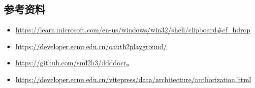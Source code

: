 \documentclass[14pt,a4paper,UTF8,twoside]{article}
\begin{document}
    \subsection{参考资料}

    \begin{itemize}
        \item \href{https://learn.microsoft.com/en-us/windows/win32/shell/clipboard#cf_hdrop}{\underline{https://learn.microsoft.com/en-us/windows/win32/shell/clipboard\#cf\_hdrop}}
        \item \href{https://developer.ecnu.edu.cn/oauth2playground/}{\underline{https://developer.ecnu.edu.cn/oauth2playground/}}
        \item \href{https://github.com/sml2h3/ddddocr}{\underline{https://github.com/sml2h3/ddddocr}}。
        \item \href{https://developer.ecnu.edu.cn/vitepress/data/architecture/authorization.html}{\underline{https://developer.ecnu.edu.cn/vitepress/data/architecture/authorization.html}}
    \end{itemize}
\end{document}
